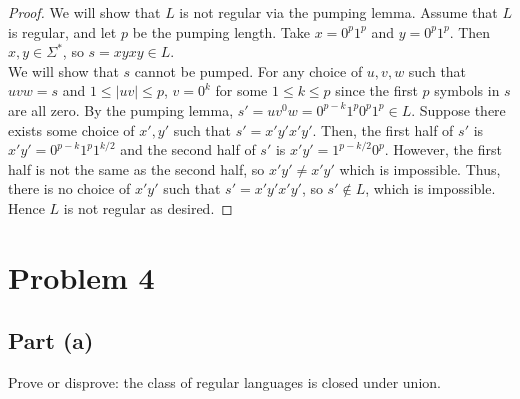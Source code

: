 \documentclass{article}
\begin{document}
\begin{proof}
    We will show that $L$ is not regular via the pumping lemma. Assume that $L$ is regular, and let $p$ be the pumping length. Take $x = 0^p 1^p$ and 
    $y = 0^p 1^p$. Then $x, y \in \Sigma^*$, so $s = xyxy \in L$. \\

    \noindent
    We will show that $s$ cannot be pumped. For any choice of $u, v, w$ such that $uvw = s$ and $1 \leq |uv| \leq p$, $v = 0^k$ for some $1 \leq k \leq p$ since
    the first $p$ symbols in $s$ are all zero. By the pumping lemma, $s' = uv^0w = 0^{p - k} 1^p 0^p 1^p \in L$. Suppose there exists some choice of $x', y'$ 
    such that $s' = x' y' x' y'$. Then, the first half of $s'$ is $x' y' = 0^{p - k}1^{p} 1^{k/2}$ and the second half of $s'$ is $x'y' = 1^{p-k/2}0^p$. 
    However, the first half is not the same as the second half, so $x' y' \neq x' y'$ which is impossible. Thus, there is no choice of $x' y'$ such that  
    $s' = x' y' x' y'$, so $s' \not \in L$, which is impossible. Hence $L$ is not regular as desired.
\end{proof}

\section*{Problem 4}

\subsection*{Part (a)}

Prove or disprove: the class of regular languages is closed under union.
\end{document}
